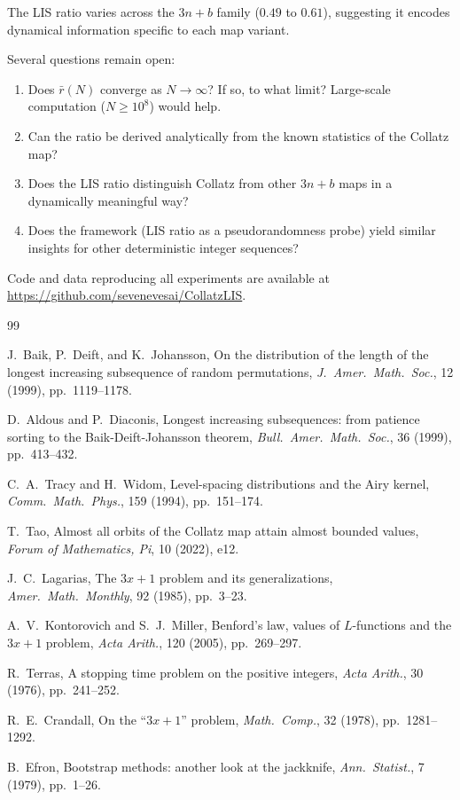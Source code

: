 \documentclass[11pt]{article}
\theoremstyle{definition}
\theoremstyle{remark}
\begin{document}
The LIS ratio varies across the $3n+b$ family ($0.49$ to $0.61$),
suggesting it encodes dynamical information specific to each map variant.

Several questions remain open:
\begin{enumerate}
  \item Does $\bar{r}(N)$ converge as $N \to \infty$? If so, to what limit?
    Large-scale computation ($N \geq 10^8$) would help.
  \item Can the ratio be derived analytically from the known statistics of
    the Collatz map?
  \item Does the LIS ratio distinguish Collatz from other $3n+b$ maps in a
    dynamically meaningful way?
  \item Does the framework (LIS ratio as a pseudorandomness probe) yield
    similar insights for other deterministic integer sequences?
\end{enumerate}

Code and data reproducing all experiments are available at
\url{https://github.com/sevenevesai/CollatzLIS}.

\begin{thebibliography}{99}

J.~Baik, P.~Deift, and K.~Johansson,
On the distribution of the length of the longest increasing subsequence
of random permutations,
\emph{J.\ Amer.\ Math.\ Soc.}, 12 (1999), pp.~1119--1178.

D.~Aldous and P.~Diaconis,
Longest increasing subsequences: from patience sorting to the
Baik-Deift-Johansson theorem,
\emph{Bull.\ Amer.\ Math.\ Soc.}, 36 (1999), pp.~413--432.

C.~A.~Tracy and H.~Widom,
Level-spacing distributions and the Airy kernel,
\emph{Comm.\ Math.\ Phys.}, 159 (1994), pp.~151--174.

T.~Tao,
Almost all orbits of the Collatz map attain almost bounded values,
\emph{Forum of Mathematics, Pi}, 10 (2022), e12.

J.~C.~Lagarias,
The $3x+1$ problem and its generalizations,
\emph{Amer.\ Math.\ Monthly}, 92 (1985), pp.~3--23.

A.~V.~Kontorovich and S.~J.~Miller,
Benford's law, values of $L$-functions and the $3x+1$ problem,
\emph{Acta Arith.}, 120 (2005), pp.~269--297.

R.~Terras,
A stopping time problem on the positive integers,
\emph{Acta Arith.}, 30 (1976), pp.~241--252.

R.~E.~Crandall,
On the ``$3x+1$'' problem,
\emph{Math.\ Comp.}, 32 (1978), pp.~1281--1292.

B.~Efron,
Bootstrap methods: another look at the jackknife,
\emph{Ann.\ Statist.}, 7 (1979), pp.~1--26.

\end{thebibliography}
\end{document}
